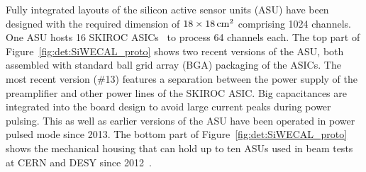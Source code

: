 Fully integrated layouts of the silicon active sensor units (ASU) have been designed with the required dimension of $18 \times 18\,{\rm cm^2}$ comprising 1024 channels. One ASU hosts 16 SKIROC ASICs~\cite{Callier:2011zz,Suehara:2018mqk} to process 64 channels each. The top part of Figure~\ref{fig:det:SiWECAL_proto} shows two recent versions of the ASU, both assembled with standard ball grid array (BGA) packaging of the ASICs. 
The most recent version (\#13) features a separation between the power supply of the preamplifier and other power lines of the SKIROC ASIC. 
Big capacitances are integrated into the board design to avoid large current peaks during power pulsing. 
This as well as earlier versions of the ASU have been operated in power pulsed mode since 2013. The bottom part of Figure~\ref{fig:det:SiWECAL_proto} shows the mechanical housing that can hold up to ten ASUs used in beam tests at CERN and DESY since 2012~\cite{Boudry:2014bxa,Poeschl:2015jma}. 

